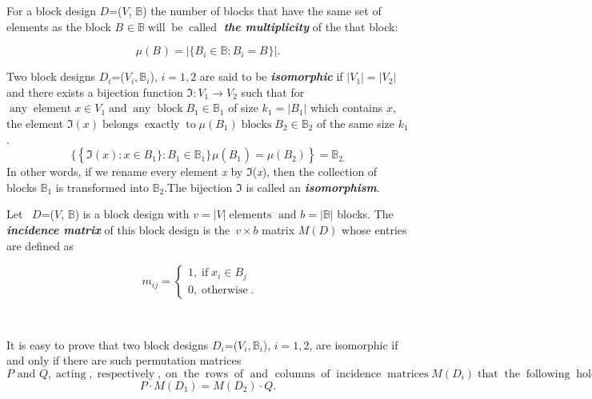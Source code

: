 \documentclass{article}
\newcommand{\infixand}{\text{ and }}
\newcommand{\nobracket}{}
\newcommand{\nosymbol}{}
\newcommand{\tmem}[1]{{\em #1\/}}
\newcommand{\tmop}[1]{\ensuremath{\operatorname{#1}}}
\newcommand{\tmstrong}[1]{\textbf{#1}}
\newenvironment{tmparmod}[3]{\begin{list}{}{\setlength{\topsep}{0pt}\setlength{\leftmargin}{#1}\setlength{\rightmargin}{#2}\setlength{\parindent}{#3}\setlength{\listparindent}{\parindent}\setlength{\itemindent}{\parindent}\setlength{\parsep}{\parskip}} \item[]}{\end{list}}
\begin{document}
\begin{tmparmod}{0pt}{0pt}{0tab}%
  For a block design $D$=($V$, $\mathbb{B}$) the number of blocks that have
  the same set of elements as the block $B_{\nosymbol} \in \mathbb{B}
  \tmop{will} \tmop{be} \tmop{called}$ {\tmstrong{{\tmem{the multiplicity}}}}
  of the that block:
\end{tmparmod}
\[ \mu (B_{\nosymbol}) = | \{ \nobracket B_i \in \mathbb{B}: B_i =
   B_{\nosymbol} \} | . \nobracket \]
\begin{tmparmod}{0pt}{0pt}{0tab}%
  Two block designs $D_i$=($V_i, \mathbb{B}_i$), $i = 1, 2$ are said to be
  {\tmstrong{{\tmem{isomorphic}}}} if $| V_1 | = | V_2 |$ and there exists a
  bijection function $\mathfrak{I}: V_1 \rightarrow V_2$ such that for
  $\tmop{any} \tmop{element} x \in V_1 \tmop{and} \tmop{any} \tmop{block} B_1
  \in \mathbb{B}_1$ of size $k_1 = | B_1 |$ which contains $x$, the element
  $\mathfrak{I} (x) \tmop{belongs} \tmop{exactly} \tmop{to} \mu (B_1)
  \tmop{blocks} B_2 \in \mathbb{B}_2$ of the same size $k_1$.\quad
  \[ \{ \nobracket \left\{ \mathfrak{I} (x) : x \in B_1 \text{\}} : B_1 \in
     \mathbb{B}_1 \text{\}}_{\nosymbol} \mu \left( {B_1}_{\nosymbol} \right) =
     \mu (B_2) \right\} =\mathbb{B}_{2.} \]
  In other words, if we rename every element {\tmem{x}} by
  $\mathfrak{I}$({\tmem{x}}), then the collection of blocks $\mathbb{B}_1$ is
  transformed into $\mathbb{B}_2$.The bijection $\mathfrak{I}$ is called an
  {\tmstrong{{\tmem{isomorphism}}}}.
  
  {\tmstrong{{\tmstrong{}}}}
\end{tmparmod}

\begin{tmparmod}{0pt}{0pt}{0tab}%
  Let \ $D$=($V$, $\mathbb{B}$) is a block design with $v = | V |
  \tmop{elements} \infixand b = | \mathbb{B} | \text{}$ blocks. The
  {\tmstrong{{\tmem{{\tmstrong{incidence matrix}}}}{\tmem{}}}} of this block
  design is the~$v \times b$ matrix $M (D)$ whose entries are defined as
\end{tmparmod}
\begin{equation}
  m_{i j} = \left\{\begin{array}{l}
    1, \tmop{if} x_i \in B_j \qquad\\
    0, \tmop{otherwise} .
  \end{array}\right.
\end{equation}
\begin{tmparmod}{0pt}{0pt}{0tab}%
  \
  
  It is easy to prove that two block designs $D_i$=($V_i, \mathbb{B}_i$), $i
  = 1, 2$, are isomorphic if and only if there are such permutation matrices
  $P \infixand Q, \tmop{acting}, \tmop{respectively}, \tmop{on} \tmop{the}
  \tmop{rows} \tmop{of} \infixand \tmop{columns} \tmop{of} \tmop{incidence}
  \tmop{matrices} M (D_i) \tmop{that} \tmop{the} \tmop{following} \tmop{holds}
  :$
  \begin{equation}
    P \cdot M (D_1) = M (D_2) \cdot Q.
  \end{equation}
\end{tmparmod}
\end{document}
